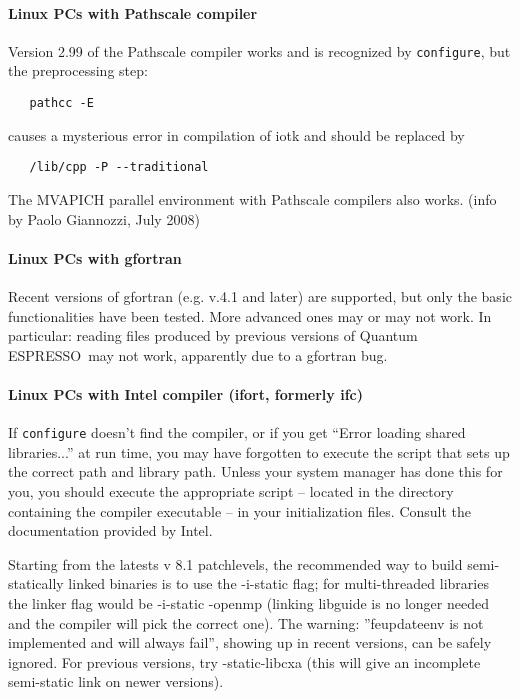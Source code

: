 \documentclass[12pt,a4paper]{article}
\def\qe{{\sc Quantum ESPRESSO}}
\begin{document}
\paragraph{Linux PCs with Pathscale compiler}

Version 2.99 of the Pathscale compiler works and is recognized by
\texttt{configure}, but the preprocessing step:
\begin{verbatim}
   pathcc -E
\end{verbatim}
causes a mysterious error in compilation of iotk and should be replaced by
\begin{verbatim}
   /lib/cpp -P --traditional
\end{verbatim}
The MVAPICH parallel environment with Pathscale compilers also works.
(info by Paolo Giannozzi, July 2008)

\paragraph{Linux PCs with gfortran}

Recent versions of gfortran (e.g. v.4.1 and later) are supported, but
only the basic functionalities have been tested. More advanced ones
may or may not work. In particular: reading files produced by previous
versions of \qe\ may not work, apparently due to a gfortran bug.

\paragraph{Linux PCs with Intel compiler (ifort, formerly ifc)}

If \texttt{configure} doesn't find the compiler, or if you get ``Error loading shared
libraries...'' at run time, you may have forgotten to execute the script that
sets up the correct path and library path. Unless your system manager has
done this for you, you should execute the appropriate script -- located in
the directory containing the compiler executable -- in your
initialization files. Consult the documentation provided by Intel. 
    
Starting from the latests v 8.1 patchlevels, the recommended way to build
semi-statically linked binaries is to use the -i-static flag; for
multi-threaded 
libraries the linker flag would be -i-static -openmp (linking libguide is
no longer needed and the compiler will pick the correct one). The warning:
''feupdateenv is not implemented and will always fail'', showing up in recent 
versions, can be safely ignored. For previous versions, try -static-libcxa 
(this will give an incomplete semi-static link on newer versions).
\end{document}
